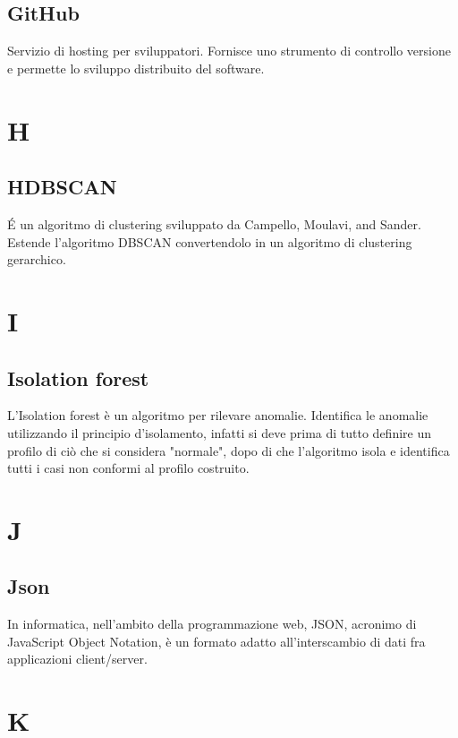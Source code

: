 \subsection{GitHub}
Servizio di hosting per sviluppatori. Fornisce uno strumento di controllo versione e permette lo sviluppo distribuito del software.

\section{H}
\subsection{HDBSCAN}
\'E un algoritmo di clustering sviluppato da Campello, Moulavi, and Sander. Estende l'algoritmo DBSCAN convertendolo in un algoritmo di clustering gerarchico.

\section{I}
\subsection{Isolation forest}
L'Isolation forest è un algoritmo per rilevare anomalie. Identifica le anomalie utilizzando il principio d'isolamento, infatti si deve prima di tutto definire un profilo di ciò che si considera "normale", dopo di che l'algoritmo isola e identifica tutti i casi non conformi al profilo costruito. 

\section{J}
\subsection{Json}
In informatica, nell'ambito della programmazione web, JSON, acronimo di JavaScript Object Notation, è un formato adatto all'interscambio di dati fra applicazioni client/server.


\section{K}


